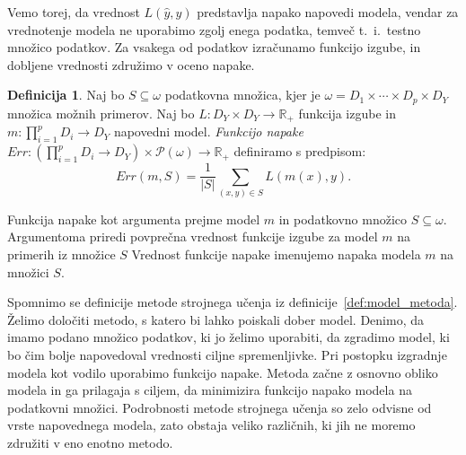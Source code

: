 \documentclass[12pt,a4paper,twoside]{article}
\theoremstyle{definition} %
\newtheorem{definicija}{Definicija}[section]
\theoremstyle{plain} %
\numberwithin{equation}{section}  %
\begin{document}
Vemo torej, da vrednost $L(\hat{y}, y)$ predstavlja napako napovedi modela, vendar za vrednotenje modela ne uporabimo zgolj enega podatka, temveč t.~i.\ testno množico podatkov. 
Za vsakega od podatkov izračunamo funkcijo izgube, in dobljene vrednosti združimo v oceno napake.

\begin{definicija}
\label{def-funkcija-napake}
	Naj bo $S \subseteq \omega$ podatkovna množica, kjer je $\omega = D_1 \times \cdots \times D_p \times D_Y$ množica možnih primerov.
	Naj bo $L: D_Y \times D_Y \rightarrow \mathbb{R}_+$ funkcija izgube in $m: \prod_{i=1}^p D_i \rightarrow D_Y$ napovedni model. 
	\emph{Funkcijo napake} $Err: (\prod_{i=1}^p D_i \rightarrow D_Y) \times \mathcal P (\omega) \rightarrow \mathbb{R}_+$ definiramo s predpisom:
	\[
	Err(m,S) = \frac{1}{|S|} \sum_{(x,y) \in S} L(m(x),y).
	\]
\end{definicija}

Funkcija napake kot argumenta prejme model $m$ in podatkovno množico $S \subseteq \omega$.
Argumentoma priredi povprečna vrednost funkcije izgube za model $m$ na primerih iz množice $S$
Vrednost funkcije napake imenujemo napaka modela $m$ na množici $S$.





Spomnimo se definicije metode strojnega učenja iz definicije~\ref{def:model_metoda}.
Želimo določiti metodo, s katero bi lahko poiskali dober model.
Denimo, da imamo podano množico podatkov, ki jo želimo uporabiti, da zgradimo model, ki bo čim bolje napovedoval vrednosti ciljne spremenljivke.
Pri postopku izgradnje modela kot vodilo uporabimo funkcijo napake.
Metoda začne z osnovno obliko modela in ga prilagaja s ciljem, da minimizira funkcijo napako modela na podatkovni množici.
Podrobnosti metode strojnega učenja so zelo odvisne od vrste napovednega modela, zato obstaja veliko različnih, ki jih ne moremo združiti v eno enotno metodo.
\end{document}
